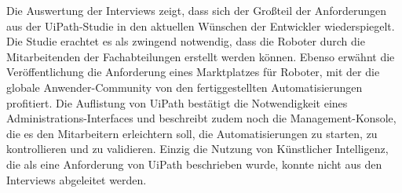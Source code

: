 Die Auswertung der Interviews zeigt, dass sich der Großteil der Anforderungen aus der UiPath-Studie in den aktuellen Wünschen der Entwickler wiederspiegelt. Die Studie erachtet es als zwingend notwendig, dass die Roboter durch die Mitarbeitenden der Fachabteilungen erstellt werden können. Ebenso erwähnt die Veröffentlichung die Anforderung eines Marktplatzes für Roboter, mit der die \glqq globale Anwender-Community\grqq{} von den fertiggestellten Automatisierungen profitiert. Die Auflistung von UiPath bestätigt die Notwendigkeit eines Administrations-Interfaces und beschreibt zudem noch die Management-Konsole, die es den Mitarbeitern erleichtern soll, die Automatisierungen zu starten, zu kontrollieren und zu validieren. Einzig die Nutzung von Künstlicher Intelligenz, die als eine Anforderung von UiPath beschrieben wurde, konnte nicht aus den Interviews abgeleitet werden.